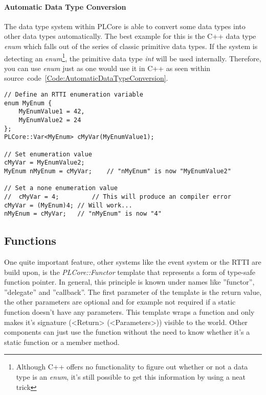 \paragraph{Automatic Data Type Conversion}
The data type system within PLCore is able to convert some data types into other data types automatically. The best example for this is the C++ data type \emph{enum} which falls out of the series of classic primitive data types. If the system is detecting an \emph{enum}\footnote{Although C++ offers no functionality to figure out whether or not a data type is an \emph{enum}, it's still possible to get this information by using a neat trick}, the primitive data type \emph{int} will be used internally. Therefore, you can use \emph{enum} just as one would use it in C++ as seen within source~code~\ref{Code:AutomaticDataTypeConversion}.
\begin{lstlisting}[float=htb,label=Code:AutomaticDataTypeConversion,caption={Automatic data type conversion}]
// Define an RTTI enumeration variable
enum MyEnum {
	MyEnumValue1 = 42,
	MyEnumValue2 = 24
};
PLCore::Var<MyEnum> cMyVar(MyEnumValue1); 

// Set enumeration value
cMyVar = MyEnumValue2;
MyEnum nMyEnum = cMyVar;	// "nMyEnum" is now "MyEnumValue2"

// Set a none enumeration value
//	cMyVar = 4;			// This will produce an compiler error
cMyVar = (MyEnum)4;	// Will work...
nMyEnum = cMyVar;	// "nMyEnum" is now "4"
\end{lstlisting}




\subsection{Functions}
One quite important feature, other systems like the event system or the \ac{RTTI} are build upon, is the \emph{PLCore::Functor} template that represents a form of type-safe function pointer. In general, this principle is known under names like ''functor'', ''delegate'' and ''callback''. The first parameter of the template is the return value, the other parameters are optional and for example not required if a static function doesn't have any parameters.  This template wraps a function and only makes it's signature (<Return> (<Parameters>)) visible to the world. Other components can just use the function without the need to know whether it's a static function or a member method.

